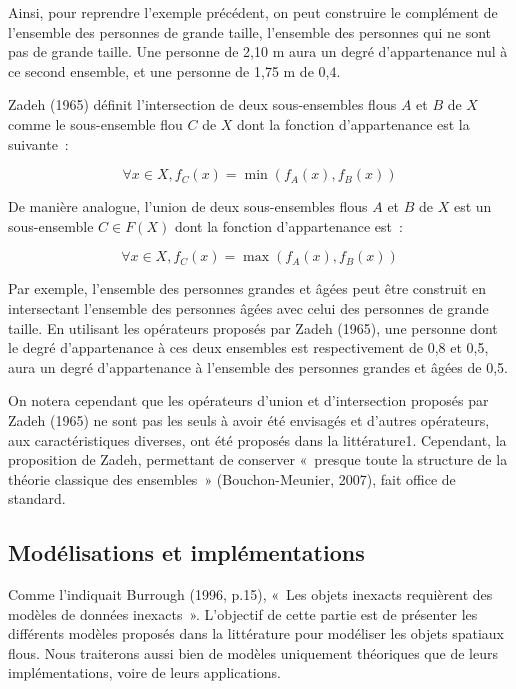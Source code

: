 Ainsi, pour reprendre l’exemple précédent, on peut construire le
complément de l’ensemble des personnes de grande taille, l’ensemble
des personnes qui ne sont pas de grande taille. Une personne de 2,10 m
aura un degré d’appartenance nul à ce second ensemble, et une personne
de 1,75 m de 0,4.

Zadeh (1965) définit l’intersection de deux sous-ensembles flous $A$
et $B$ de $X$ comme le sous-ensemble flou $C$ de $X$ dont la fonction
d’appartenance est la suivante :

\begin{equation}
  ∀x ∈ X, f_C (x) = \min(f_A(x), f_B(x))
\end{equation}

De manière analogue, l’union de deux sous-ensembles flous $A$ et $B$
de $X$ est un sous-ensemble $C ∈ F(X)$ dont la fonction d’appartenance
est :

\begin{equation}
    ∀x ∈ X, f_C (x) = \max(f_A(x), f_B(x))
  \end{equation}

  Par exemple, l’ensemble des personnes grandes et âgées peut être
  construit en intersectant l’ensemble des personnes âgées avec celui
  des personnes de grande taille. En utilisant les opérateurs proposés
  par Zadeh (1965), une personne dont le degré d’appartenance à ces
  deux ensembles est respectivement de 0,8 et 0,5, aura un degré
  d’appartenance à l’ensemble des personnes grandes et âgées de 0,5.

  On notera cependant que les opérateurs d’union et d’intersection
  proposés par Zadeh (1965) ne sont pas les seuls à avoir été
  envisagés et d’autres opérateurs, aux caractéristiques diverses, ont
  été proposés dans la littérature1. Cependant, la proposition de
  Zadeh, permettant de conserver « presque toute la structure de la
  théorie classique des ensembles » (Bouchon-Meunier, 2007), fait
  office de standard.



  \subsection{Modélisations et implémentations}


  Comme l’indiquait Burrough (1996, p.15), « Les objets inexacts
  requièrent des modèles de données inexacts ». L’objectif de cette
  partie est de présenter les différents modèles proposés dans la
  littérature pour modéliser les objets spatiaux flous. Nous
  traiterons aussi bien de modèles uniquement théoriques que de leurs
  implémentations, voire de leurs applications.
  
